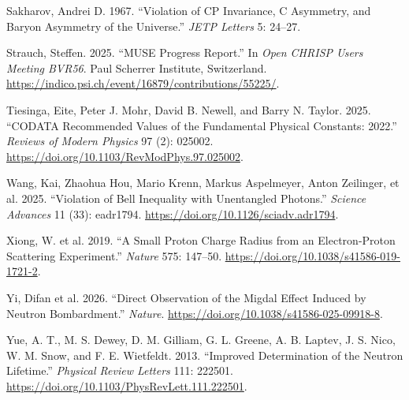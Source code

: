 \documentclass[
  11pt,
  letterpaper,
  twoside,
  openright]{book}
\newlength{\cslhangindent}
\newenvironment{CSLReferences}[2] %
 {\begin{list}{}{%
  \setlength{\itemindent}{0pt}
  \setlength{\leftmargin}{0pt}
  \setlength{\parsep}{0pt}
  \ifodd #1
   \setlength{\leftmargin}{\cslhangindent}
   \setlength{\itemindent}{-1\cslhangindent}
  \fi
  \setlength{\itemsep}{#2\baselineskip}}}
 {\end{list}}
\begin{document}
\begin{CSLReferences}{1}{0}
Sakharov, Andrei D. 1967. {``Violation of {CP} Invariance, {C}
Asymmetry, and Baryon Asymmetry of the Universe.''} \emph{JETP Letters}
5: 24--27.

Strauch, Steffen. 2025. {``{MUSE} Progress Report.''} In \emph{Open
CHRISP Users Meeting BVR56}. Paul Scherrer Institute, Switzerland.
\url{https://indico.psi.ch/event/16879/contributions/55225/}.

Tiesinga, Eite, Peter J. Mohr, David B. Newell, and Barry N. Taylor.
2025. {``{CODATA} Recommended Values of the Fundamental Physical
Constants: 2022.''} \emph{Reviews of Modern Physics} 97 (2): 025002.
\url{https://doi.org/10.1103/RevModPhys.97.025002}.

Wang, Kai, Zhaohua Hou, Mario Krenn, Markus Aspelmeyer, Anton Zeilinger,
et al. 2025. {``Violation of {Bell} Inequality with Unentangled
Photons.''} \emph{Science Advances} 11 (33): eadr1794.
\url{https://doi.org/10.1126/sciadv.adr1794}.

Xiong, W. et al. 2019. {``A Small Proton Charge Radius from an
Electron-Proton Scattering Experiment.''} \emph{Nature} 575: 147--50.
\url{https://doi.org/10.1038/s41586-019-1721-2}.

Yi, Difan et al. 2026. {``Direct Observation of the {Migdal} Effect
Induced by Neutron Bombardment.''} \emph{Nature}.
\url{https://doi.org/10.1038/s41586-025-09918-8}.

Yue, A. T., M. S. Dewey, D. M. Gilliam, G. L. Greene, A. B. Laptev, J.
S. Nico, W. M. Snow, and F. E. Wietfeldt. 2013. {``Improved
Determination of the Neutron Lifetime.''} \emph{Physical Review Letters}
111: 222501. \url{https://doi.org/10.1103/PhysRevLett.111.222501}.

\end{CSLReferences}


\backmatter
\end{document}
